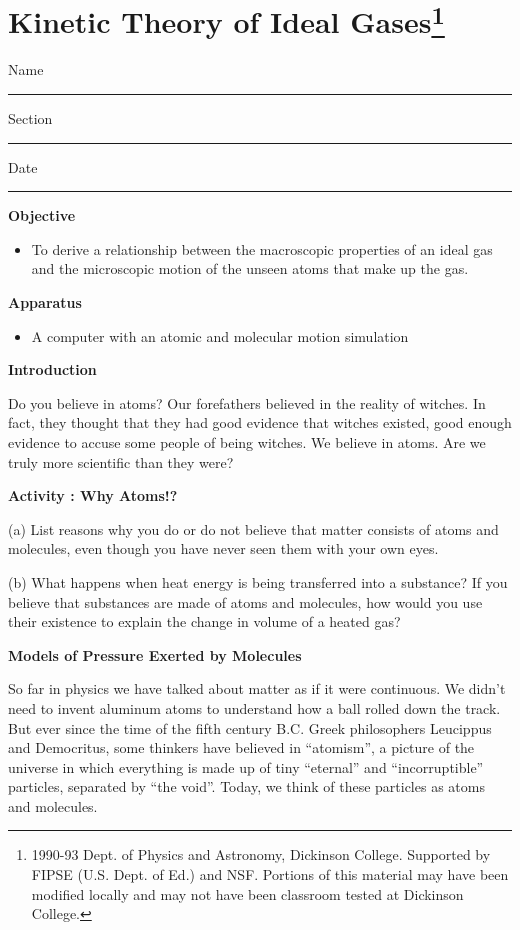 \section{Kinetic Theory of Ideal Gases\footnote{%
1990-93 Dept. of Physics and Astronomy, Dickinson College. Supported
by FIPSE (U.S. Dept. of Ed.) and NSF. Portions of this material may
have been modified locally and may not have been classroom tested
at Dickinson College.
}}

Name \rule{2.0in}{0.1pt}\hfill{}Section \rule{1.0in}{0.1pt}\hfill{}Date
\rule{1.0in}{0.1pt}

\textbf{Objective} 

\begin{itemize}
\item To derive a relationship between the macroscopic properties of an
ideal gas and the microscopic motion of the unseen atoms that make
up the gas. 
\end{itemize}

\textbf{Apparatus}

\begin{itemize}
\item A computer with an atomic and molecular motion simulation
\end{itemize}
\textbf{Introduction}

Do you believe in atoms? Our forefathers believed in the reality of
witches. In fact, they thought that they had good evidence that witches
existed, good enough evidence to accuse some people of being witches.
We believe in atoms. Are we truly more scientific than they were?

\textbf{Activity : Why Atoms!?}

(a) List reasons why you do or do not believe that matter consists
of atoms and molecules, even though you have never seen them with
your own eyes.
\vspace{20mm}

(b) What happens when heat energy is being transferred into a substance?
If you believe that substances are made of atoms and molecules, how
would you use their existence to explain the change in volume of a
heated gas?
\vspace{20mm}

\textbf{Models of Pressure Exerted by Molecules}

So far in physics we have talked about matter as if it were continuous.
We didn't need to invent aluminum atoms to understand how a ball rolled
down the track. But ever since the time of the fifth century B.C.
Greek philosophers Leucippus and Democritus, some thinkers have believed
in {}``atomism'', a picture of the universe in which everything
is made up of tiny {}``eternal'' and {}``incorruptible'' particles,
separated by {}``the void''. Today, we think of these particles
as atoms and molecules.


